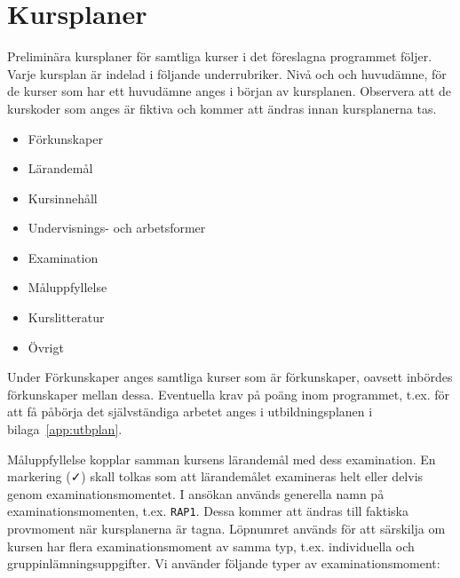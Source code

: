 \chapter{Kursplaner}\label{app:kursplaner}

Preliminära kursplaner för samtliga kurser i det föreslagna programmet följer. Varje kursplan är indelad i följande underrubriker. Nivå och och huvudämne, för de kurser som har ett huvudämne anges i början av kursplanen. Observera att de kurskoder som anges är fiktiva och kommer att ändras innan kursplanerna tas. 

\begin{itemize}
	\tightlist
\item Förkunskaper
\item Lärandemål
\item Kursinnehåll
\item Undervisnings- och arbetsformer
\item Examination
\item Måluppfyllelse
\item Kurslitteratur
\item Övrigt
\end{itemize}

Under Förkunskaper anges samtliga kurser som är förkunskaper, oavsett inbördes förkunskaper mellan dessa. Eventuella krav på poäng inom programmet, t.ex. för att få påbörja det självständiga arbetet anges i utbildningsplanen i bilaga~\ref{app:utbplan}.

Måluppfyllelse kopplar samman kursens lärandemål med dess examination. En markering (\faCheck) skall tolkas som att lärandemålet examineras helt eller delvis genom examinationsmomentet. I ansökan används generella namn på examinationsmomenten, t.ex. \texttt{RAP1}. Dessa kommer att ändras till faktiska provmoment när kursplanerna är tagna. Löpnumret används för att särskilja om kursen har flera examinationsmoment av samma typ, t.ex. individuella och gruppinlämningsuppgifter. Vi använder följande typer av examinationsmoment:

